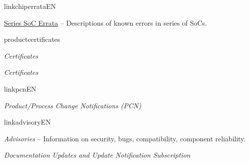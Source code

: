 {\begin{minipage}{\textwidth}
\begin{itemize}
  \ifcsname linkchiperrataEN\endcsname%
    {%
    \item \href{\linkprefix\linkchiperrataEN}{\chipseries{} Series SoC Errata} --
        {\small Descriptions of known errors in \chipseries{} series of SoCs.}
        }%
  \fi%
  
  \ifcsname productcertificates\endcsname%
    \item \textit{Certificates}\\
        \href{\linkprefix\linkcertificatesEN\productcertificates}{\linkprefix\linkcertificatesEN}
  \else
    \item \textit{Certificates}\\
        \href{\linkprefix\linkcertificatesEN}{\linkprefix\linkcertificatesEN}
  \fi%

  \ifcsname linkpcnEN\endcsname%
    \item \textit{\chipseries{} Product/Process Change Notifications (PCN)}\\
        \href{\linkprefix\linkpcnEN}{\linkprefix\linkpcnEN}
  \fi%

  \ifcsname linkadvisoryEN\endcsname%
    \item \textit{\chipseries{} Advisories} --
        {\small Information on security, bugs, compatibility, component reliability.}\\
        \href{\linkprefix\linkadvisoryEN}{\linkprefix\linkadvisoryEN}
  \fi%

    \item \textit{Documentation Updates and Update Notification Subscription}\\
        \href{\linkprefix\linkrecentlyupdatedEN}{\linkprefix\linkrecentlyupdatedEN}

\end{itemize}

\end{minipage}



\begin{minipage}{\textwidth}


\end{minipage}}
